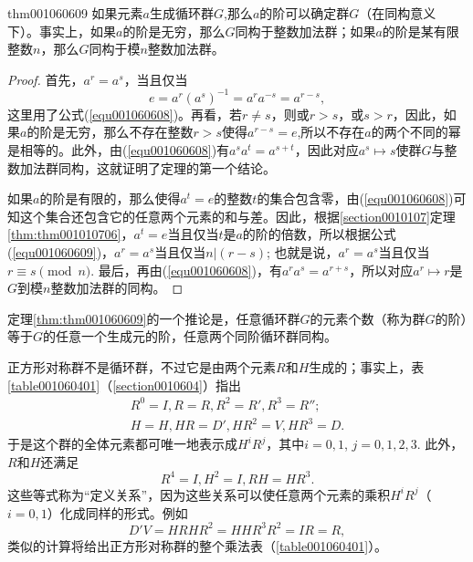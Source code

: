 \begin{theorem}{}{thm001060609}
如果元素$a$生成循环群$G$,那么$a$的阶可以确定群$G$（在同构意义下）。事实上，如果$a$的阶是无穷，那么$G$同构于整数加法群；如果$a$的阶是某有限整数$n$，那么$G$同构于模$n$整数加法群。
\end{theorem}

\begin{proof}
首先，$a^r = a^s$，当且仅当
\begin{equation}\label{equ001060609}
e = a^{r}(a^s)^{-1} = a^ra^{-s} = a^{r-s},
\end{equation}
这里用了公式(\ref{equ001060608})。再看，若$r \neq s$，则或$r > s$，或$s > r$，因此，如果$a$的阶是无穷，那么不存在整数$r > s$使得$a^{r-s} = e$,所以不存在$a$的两个不同的幂是相等的。此外，由(\ref{equ001060608})有$a^sa^t = a^{s+t}$，因此对应$a^s \mapsto s$使群$G$与整数加法群同构，这就证明了定理的第一个结论。

如果$a$的阶是有限的，那么使得$a^t=e$的整数$t$的集合包含零，由(\ref{equ001060608})可知这个集合还包含它的任意两个元素的和与差。因此，根据\ref{section0010107}定理\ref{thm:thm001010706}，$a^t=e$当且仅当$t$是$a$的阶的倍数，所以根据公式(\ref{equ001060609})，$a^r=a^s$当且仅当$n|(r-s)$; 也就是说，$a^r=a^s$当且仅当$r \equiv s \pmod{n}$. 最后，再由(\ref{equ001060608})，有$a^ra^s=a^{r+s}$，所以对应$a^r \mapsto r$是$G$到模$n$整数加法群的同构。
\end{proof}

定理\ref{thm:thm001060609}的一个推论是，任意循环群$G$的元素个数（称为群$G$的阶）等于$G$的任意一个生成元的阶，任意两个同阶循环群同构。

正方形对称群不是循环群，不过它是由两个元素$R$和$H$生成的；事实上，表\ref{table001060401}（\ref{section0010604}）指出
\begin{gather*}
R^0=I, R=R, R^2=R', R^3=R'';\\
H=H, HR=D', HR^2=V, HR^3=D.
\end{gather*}
于是这个群的全体元素都可唯一地表示成$H^iR^j$，其中$i=0,1$, $j=0,1,2,3$. 此外，$R$和$H$还满足
\[
R^4=I, H^2=I, RH=HR^3.
\]
这些等式称为“定义关系”，因为这些关系可以使任意两个元素的乘积$H^iR^j$（$i=0,1$）化成同样的形式。例如
\[
D'V=HRHR^2 = HHR^3R^2=IR=R,
\]
类似的计算将给出正方形对称群的整个乘法表（\ref{table001060401}）。


